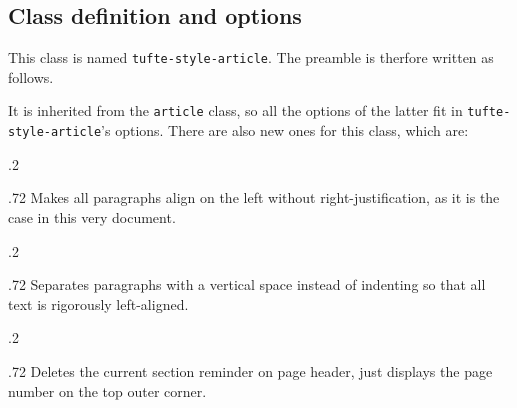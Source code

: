 \documentclass[
	raggedright,
	12pt,
	colorful,
]{tufte-style-article}
\begin{document}
\subsection{Class definition and options}

This class is named \texttt{tufte-style-article}. The preamble is therfore written as follows.

It is inherited from the \texttt{article} class, so all the options of the latter fit in \texttt{tufte-style-article}'s options. There are also new ones for this class, which are:

\medskip
\begin{minipagewithmarginpars}[t]{.2\textwidth}
	\raggedleft
\end{minipagewithmarginpars}\hfill%
\begin{minipagewithmarginpars}[t]{.72\textwidth}
	Makes all paragraphs align on the left without right-justification, as it is the case in this very document.
\end{minipagewithmarginpars}
\bigskip

\begin{minipagewithmarginpars}[t]{.2\textwidth}
	\raggedleft
\end{minipagewithmarginpars}\hfill%
\begin{minipagewithmarginpars}[t]{.72\textwidth}
	Separates paragraphs with a vertical space instead of indenting so that all text is rigorously left-aligned.
\end{minipagewithmarginpars}
\bigskip

\begin{minipagewithmarginpars}[t]{.2\textwidth}
	\raggedleft
\end{minipagewithmarginpars}\hfill%
\begin{minipagewithmarginpars}[t]{.72\textwidth}
	Deletes the current section reminder on page header, just displays the page number on the top outer corner.
\end{minipagewithmarginpars}
\bigskip
\end{document}
